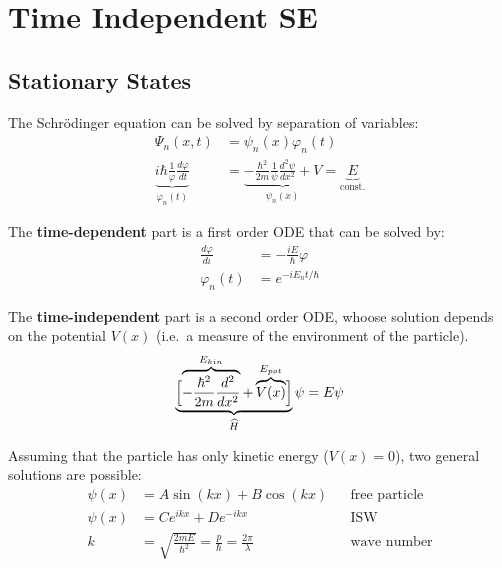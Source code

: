 \section{Time Independent SE}

\subsection{Stationary States}
The Schrödinger equation can be solved by separation of variables:
\noindent\begin{align*}
    \Psi_n(x,t)                                                        & = \psi_n(x)\varphi_n(t)                                                                                          \\
    \underbrace{i\hbar\frac1\varphi\frac{d\varphi}{dt}}_{\varphi_n(t)} & =\underbrace{-\frac{\hbar^2}{2m}\frac1\psi\frac{d^2\psi}{dx^2}+V}_{\psi_n (x)} = \underbrace{E}_{\text{const.}}
\end{align*}


The \textbf{time-dependent} part is a first order ODE that can be solved by:
\noindent\begin{align*}
    \frac{d\varphi}{d\iota} & =-\frac{iE}{\hbar}\varphi \\
    \varphi_n(t)            & =e^{-iE_n t/\hbar}
\end{align*}


The \textbf{time-independent} part is a second order ODE, whoose solution depends on the potential $V(x)$ (i.e.\ a measure of the environment of the particle).
\noindent\begin{equation*}
    \underbrace{\Bigl[\overbrace{-\frac{\hbar^2}{2m}\frac{d^2}{dx^2}}^{E_{kin}}+ \overbrace{V(x)}^{E_{pot}}\Bigr]}_{\widehat{H}}\psi = E\psi
\end{equation*}

\newpar{}
Assuming that the particle has only kinetic energy ($V(x) = 0$), two general solutions are possible:
\noindent\begin{align*}
    \psi(x) & =A\sin(kx)+B\cos(kx)                                               &  & \text{free particle} \\
    \psi(x) & =Ce^{ikx}+De^{-ikx}                                                &  & \text{ISW}           \\
    k       & =\sqrt{\frac{2mE}{\hbar^{2}}}=\frac{p}{\hbar}=\frac{2\pi}{\lambda} &  & \text{wave number}
\end{align*}

